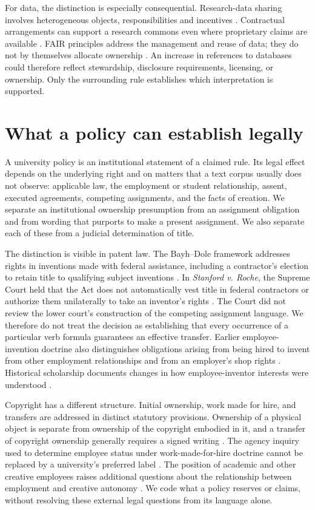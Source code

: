 \documentclass[12pt]{article}
\begin{document}
For data, the distinction is especially consequential. Research-data sharing involves heterogeneous objects, responsibilities and incentives \citep{borgman2012}. Contractual arrangements can support a research commons even where proprietary claims are available \citep{reichman2003}. FAIR principles address the management and reuse of data; they do not by themselves allocate ownership \citep{wilkinson2016}. An increase in references to databases could therefore reflect stewardship, disclosure requirements, licensing, or ownership. Only the surrounding rule establishes which interpretation is supported.

\section{What a policy can establish legally}
A university policy is an institutional statement of a claimed rule. Its legal effect depends on the underlying right and on matters that a text corpus usually does not observe: applicable law, the employment or student relationship, assent, executed agreements, competing assignments, and the facts of creation. We separate an institutional ownership presumption from an assignment obligation and from wording that purports to make a present assignment. We also separate each of these from a judicial determination of title.

The distinction is visible in patent law. The Bayh--Dole framework addresses rights in inventions made with federal assistance, including a contractor's election to retain title to qualifying subject inventions \citep{bayhdole2024}. In \textit{Stanford v. Roche}, the Supreme Court held that the Act does not automatically vest title in federal contractors or authorize them unilaterally to take an inventor's rights \citep[pp. 785--789]{roche2011}. The Court did not review the lower court's construction of the competing assignment language. We therefore do not treat the decision as establishing that every occurrence of a particular verb formula guarantees an effective transfer. Earlier employee-invention doctrine also distinguishes obligations arising from being hired to invent from other employment relationships and from an employer's shop rights \citep[pp. 187--189]{dubilier1933}. Historical scholarship documents changes in how employee-inventor interests were understood \citep{fisk1998}.

Copyright has a different structure. Initial ownership, work made for hire, and transfers are addressed in distinct statutory provisions. Ownership of a physical object is separate from ownership of the copyright embodied in it, and a transfer of copyright ownership generally requires a signed writing \citep[sections 101, 201, 202 and 204]{copyrightact}. The agency inquiry used to determine employee status under work-made-for-hire doctrine cannot be replaced by a university's preferred label \citep{reid1989}. The position of academic and other creative employees raises additional questions about the relationship between employment and creative autonomy \citep{dreyfuss1987}. We code what a policy reserves or claims, without resolving these external legal questions from its language alone.
\end{document}

